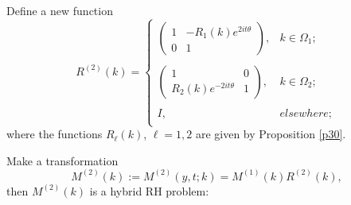\documentclass[11pt]{article}
\numberwithin{equation}{section}
\begin{document}
Define  a new  function
\begin{equation}
R^{(2)}(k)=\left\{\begin{array}{lll}
\left(\begin{array}{cc}
1 & -R_{1}(k)e^{2it\theta}\\
0 & 1
\end{array}\right), & k\in \Omega_{1};\\
\\
\left(\begin{array}{cc}
1 & 0\\
R_{2}(k)e^{-2it\theta} & 1
\end{array}\right),  &k\in \Omega_{2};\\
\\
I,  &elsewhere;\\
\end{array}\right.
\end{equation}
where   the functions $R_{\ell}(k)$, $\ell=1,2$ are given by  Proposition \ref{p30}.

Make  a transformation
\begin{equation}\label{eq72}
M^{(2)}(k):=M^{(2)}(y,t;k)=M^{(1)}(k)R^{(2)}(k),
\end{equation}
then $M^{(2)}(k)$ is a hybrid RH problem:
\end{document}
